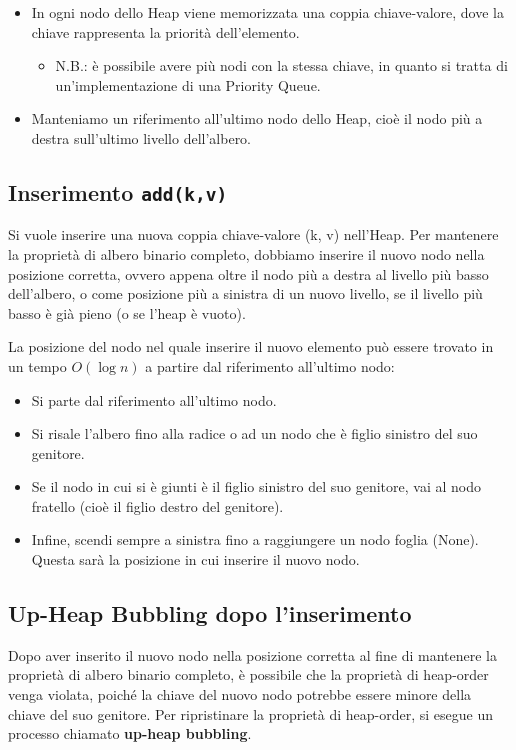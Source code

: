 \begin{itemize}
    \item In ogni nodo dello Heap viene memorizzata una coppia chiave-valore, dove la chiave rappresenta la priorità dell'elemento.
    \begin{itemize}
        \item N.B.: è possibile avere più nodi con la stessa chiave, in quanto si tratta di un'implementazione di una Priority Queue.
    \end{itemize}
    \item Manteniamo un riferimento all'ultimo nodo dello Heap, cioè il nodo più a destra sull'ultimo livello dell'albero.
\end{itemize}


\clearpage
\subsection*{Inserimento \texttt{add(k,v)}}
Si vuole inserire una nuova coppia chiave-valore (k, v) nell'Heap. Per mantenere la proprietà di albero binario completo, dobbiamo inserire il nuovo nodo nella posizione corretta, ovvero appena oltre il nodo più a destra al livello più basso dell'albero, o come posizione più a sinistra di un nuovo livello, se il livello più basso è già pieno (o se l'heap è vuoto).

La posizione del nodo nel quale inserire il nuovo elemento può essere trovato in un tempo $O(\log n)$ a partire dal riferimento all'ultimo nodo:
\begin{itemize}
    \item Si parte dal riferimento all'ultimo nodo.
    \item Si risale l'albero fino alla radice o ad un nodo che è figlio sinistro del suo genitore.
    \item Se il nodo in cui si è giunti è il figlio sinistro del suo genitore, vai al nodo fratello (cioè il figlio destro del genitore).
    \item Infine, scendi sempre a sinistra fino a raggiungere un nodo foglia (None). Questa sarà la posizione in cui inserire il nuovo nodo.
\end{itemize}



\subsection*{Up-Heap Bubbling dopo l'inserimento}
Dopo aver inserito il nuovo nodo nella posizione corretta al fine di mantenere la proprietà di albero binario completo, è possibile che la proprietà di heap-order venga violata, poiché la chiave del nuovo nodo potrebbe essere minore della chiave del suo genitore. Per ripristinare la proprietà di heap-order, si esegue un processo chiamato \textbf{up-heap bubbling}.

